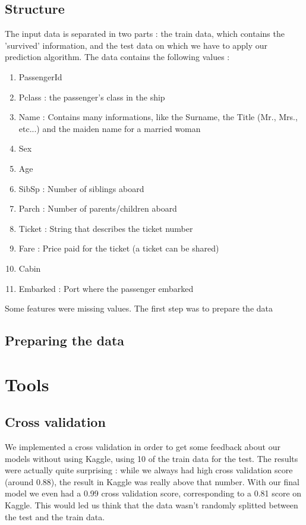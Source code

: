 \documentclass[a4paper,10pt]{report}
\begin{document}
\subsection{Structure}
The input data is separated in two parts : the train data, which contains the 'survived' information, and the test data
on which we have to apply our prediction algorithm.
The data contains the following values :
\begin{enumerate}
 \item PassengerId 
 \item Pclass : the passenger's class in the ship
 \item Name : Contains many informations, like the Surname, the Title (Mr., Mrs., etc...) and the maiden name for a married woman
 \item Sex
 \item Age 
 \item SibSp : Number of siblings aboard
 \item Parch : Number of parents/children aboard
 \item Ticket : String that describes the ticket number
 \item Fare : Price paid for the ticket (a ticket can be shared)
 \item Cabin
 \item Embarked : Port where the passenger embarked
\end{enumerate}

Some features were missing values. The first step was to prepare the data

\subsection{Preparing the data}

\section{Tools}
\subsection{Cross validation}
We implemented a cross validation in order to get some feedback about our models without using Kaggle, using 10%
of the train data for the test. The results were actually quite surprising : while we always had 
high cross validation score (around 0.88), the result in Kaggle was really above that number.
With our final model we even had a 0.99 cross validation score, corresponding to a 0.81 score on Kaggle. 
This would led us think that the data wasn't randomly splitted between the test and the train data. 
\end{document}
